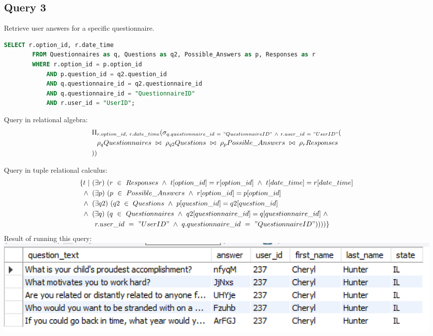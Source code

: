 \documentclass[12pt, oneside]{article}
\begin{document}
    \subsection*{Query 3}
    \noindent Retrieve user answers for a specific questionnaire.
    \begin{lstlisting}[language=SQL, columns=flexible, breaklines]
        SELECT r.option_id, r.date_time
        FROM Questionnaires as q, Questions as q2, Possible_Answers as p, Responses as r
        WHERE r.option_id = p.option_id 
            AND p.question_id = q2.question_id 
            AND q.questionnaire_id = q2.questionnaire_id
            AND q.questionnaire_id = "QuestionnaireID"
            AND r.user_id = "UserID";
    \end{lstlisting}
    \noindent Query in relational algebra: 
    \begin{align*}
        \Pi&_{r.option\_id,\ r.date\_time}(\sigma_{q.questionnaire\_id\ =\ "QuestionnaireID"\ \wedge\ r.user\_id\ =\ "UserID"}
        (\\
        &\rho_{q}Questionnaires\ \bowtie\ \rho_{q2}Questions\ \bowtie\ \rho_{p}Possible\_Answers\ \bowtie\ \rho_{r}Responses\\
        ))&
    \end{align*}
    
    \bigskip
    \noindent \noindent \noindent Query in tuple relational calculus: 
    \begin{align*}
        \{t\ |\ (&\exists r)\ (r\ \in\ Responses\ \wedge\ t[option\_id] = r[option\_id]\ \wedge\ t[date\_time] = r[date\_time]\\
        \newline\wedge\ (&\exists p)\ (p\ \in\ Possible\_Answers\ \wedge\ r[option\_id]=p[option\_id]\\
        \newline\wedge\ (&\exists q2)\ (q2\ \in\ Questions\ \wedge\ p[question\_id] = q2[question\_id]\\
        \newline\wedge\ (&\exists q)\ (q\ \in\ Questionnaires\ \wedge\ q2[questionnaire\_id] = q[questionnaire\_id]\ \wedge\ \\
        &r.user\_id\ =\ "UserID"\ \wedge\ q.questionnaire\_id\ =\ "QuestionnaireID"))))\}
    \end{align*}
    \noindent Result of running this query:\\
    \includegraphics{questionstatequeryresult.PNG}
\end{document}
